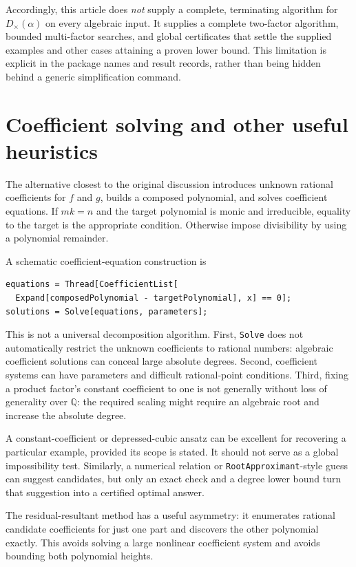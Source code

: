 \documentclass[11pt,a4paper]{article}
\theoremstyle{definition}\newtheorem{definition}[theorem]{Definition}
\theoremstyle{remark}\newtheorem{remark}[theorem]{Remark}
\newcommand{\Q}{\mathbb{Q}}\newcommand{\C}{\mathbb{C}}
\newcommand{\code}[1]{\texttt{#1}}
\begin{document}
Accordingly, this article does \emph{not} supply a complete, terminating algorithm for $D_{\times}(\alpha)$ on every algebraic input. It supplies a complete two-factor algorithm, bounded multi-factor searches, and global certificates that settle the supplied examples and other cases attaining a proven lower bound. This limitation is explicit in the package names and result records, rather than being hidden behind a generic simplification command.

\section{Coefficient solving and other useful heuristics}
The alternative closest to the original discussion introduces unknown rational coefficients for $f$ and $g$, builds a composed polynomial, and solves coefficient equations. If $mk=n$ and the target polynomial is monic and irreducible, equality to the target is the appropriate condition. Otherwise impose divisibility by using a polynomial remainder.

A schematic coefficient-equation construction is
\begin{lstlisting}
equations = Thread[CoefficientList[
  Expand[composedPolynomial - targetPolynomial], x] == 0];
solutions = Solve[equations, parameters];
\end{lstlisting}
This is not a universal decomposition algorithm. First, \code{Solve} does not automatically restrict the unknown coefficients to rational numbers: algebraic coefficient solutions can conceal large absolute degrees. Second, coefficient systems can have parameters and difficult rational-point conditions. Third, fixing a product factor's constant coefficient to one is not generally without loss of generality over $\Q$: the required scaling might require an algebraic root and increase the absolute degree.

A constant-coefficient or depressed-cubic ansatz can be excellent for recovering a particular example, provided its scope is stated. It should not serve as a global impossibility test. Similarly, a numerical relation or \code{RootApproximant}-style guess can suggest candidates, but only an exact check and a degree lower bound turn that suggestion into a certified optimal answer.

The residual-resultant method has a useful asymmetry: it enumerates rational candidate coefficients for just one part and discovers the other polynomial exactly. This avoids solving a large nonlinear coefficient system and avoids bounding both polynomial heights.
\end{document}
